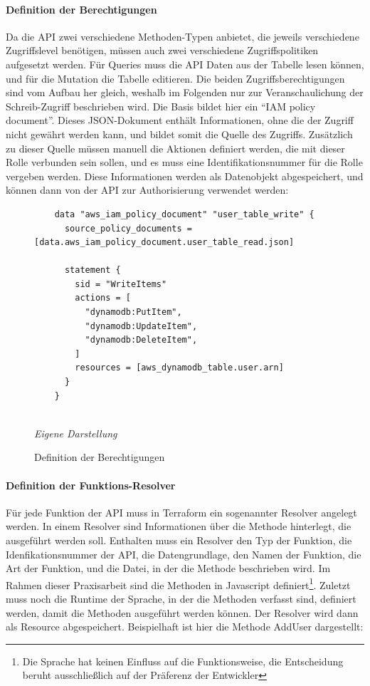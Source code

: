 \paragraph{Definition der Berechtigungen}
Da die API zwei verschiedene Methoden-Typen anbietet, die jeweils verschiedene Zugriffslevel benötigen, müssen auch zwei verschiedene Zugriffspolitiken aufgesetzt werden. Für Queries muss die API Daten aus der Tabelle lesen können, und für die Mutation die Tabelle editieren. Die beiden Zugriffsberechtigungen sind vom Aufbau her gleich, weshalb im Folgenden nur zur Veranschaulichung der Schreib-Zugriff beschrieben wird. Die Basis bildet hier ein ``IAM policy document''. Dieses JSON-Dokument enthält Informationen, ohne die der Zugriff nicht gewährt werden kann, und bildet somit die Quelle des Zugriffs. Zusätzlich zu dieser Quelle müssen manuell die Aktionen definiert werden, die mit dieser Rolle verbunden sein sollen, und es muss eine Identifikationsnummer für die Rolle vergeben werden. Diese Informationen werden als Datenobjekt abgespeichert, und können dann von der API zur Authorisierung verwendet werden:
\newline
\newline
	\begin{figure}[H]
	\centering
	\begin{minipage}[t]{.7\textwidth} %
	\caption{Definition der Berechtigungen} %
	\begin{verbatim}
	data "aws_iam_policy_document" "user_table_write" {
	  source_policy_documents = [data.aws_iam_policy_document.user_table_read.json]
	
	  statement {
	    sid = "WriteItems"
	    actions = [
	      "dynamodb:PutItem",
	      "dynamodb:UpdateItem",
	      "dynamodb:DeleteItem",
	    ]
	    resources = [aws_dynamodb_table.user.arn]
	  }
	}
	
	\end{verbatim}
	
	\textit{Eigene Darstellung} %
	\label{fig:berechtigungsDefinition}
	\end{minipage}
	\end{figure}
\paragraph{Definition der Funktions-Resolver}
Für jede Funktion der API muss in Terraform ein sogenannter Resolver angelegt werden. In einem Resolver sind Informationen über die Methode hinterlegt, die ausgeführt werden soll. Enthalten muss ein Resolver den Typ der Funktion, die Idenfikationsnummer der API, die Datengrundlage, den Namen der Funktion, die Art der Funktion, und die Datei, in der die Methode beschrieben wird. Im Rahmen dieser Praxisarbeit sind die Methoden in Javascript definiert\footnote{Die Sprache hat keinen Einfluss auf die Funktionsweise, die Entscheidung beruht ausschließlich auf der Präferenz der Entwickler}. Zuletzt muss noch die Runtime der Sprache, in der die Methoden verfasst sind, definiert werden, damit die Methoden ausgeführt werden können. Der Resolver wird dann als Resource abgespeichert. Beispielhaft ist hier die Methode AddUser dargestellt:

